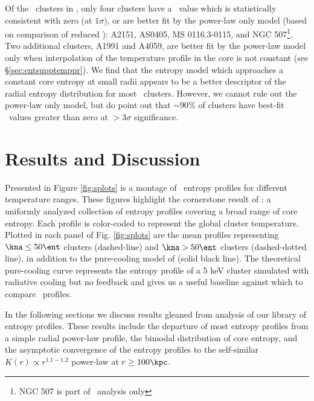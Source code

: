 Of the \entsuppnum\ clusters in \accept, only four clusters have a
\kna\ value which is statistically consistent with zero (at
$1\sigma$), or are better fit by the power-law only model (based on
comparison of reduced \chisq): A2151, AS0405, MS 0116.3-0115, and NGC
507\footnote{NGC 507 is part of \hifl\ analysis only}. Two additional
clusters, A1991 and A4059, are better fit by the power-law model only
when interpolation of the temperature profile in the core is not
constant (see \S\ref{sec:entsupptemppr}). We find that the entropy
model which approaches a constant core entropy at small radii appears
to be a better descriptor of the radial entropy distribution for most
\accept\ clusters. However, we cannot rule out the power-law only
model, but do point out that $\sim90\%$ of clusters have best-fit
\kna\ values greater than zero at $> 3\sigma$ significance.

\section{Results and Discussion}
\label{sec:entsuppr&d}

Presented in Figure \ref{fig:splots} is a montage of \accept\ entropy
profiles for different temperature ranges. These figures highlight the
cornerstone result of \accept: a uniformly analyzed collection of
entropy profiles covering a broad range of core entropy. Each profile
is color-coded to represent the global cluster temperature. Plotted in
each panel of Fig. \ref{fig:splots} are the mean profiles representing
$\kna \le 50 \ent$ clusters (dashed-line) and $\kna > 50 \ent$
clusters (dashed-dotted line), in addition to the pure-cooling model
of \citet{voitbryan} (solid black line). The theoretical pure-cooling
curve represents the entropy profile of a 5 keV cluster simulated with
radiative cooling but no feedback and gives us a useful baseline
against which to compare \accept\ profiles.

In the following sections we discuss results gleaned from analysis of
our library of entropy profiles. These results include the departure
of most entropy profiles from a simple radial power-law profile, the
bimodal distribution of core entropy, and the asymptotic convergence
of the entropy profiles to the self-similar $K(r) \propto r^{1.1-1.2}$
power-law at $r \geq 100\kpc$.

